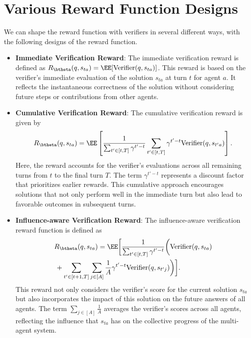 \section{Various Reward Function Designs} 
\label{appendix_reward}
{We can shape the reward function with verifiers in several different ways, with the following designs of the reward function.} 


\begin{itemize}
    \item \textbf{Immediate Verification Reward}: The immediate verification reward is defined as \( R_{\btheta} (q, s_{ta}) = \EE[\text{Verifier}(q, s_{ta})] \). This reward is based on the verifier's immediate evaluation of the solution \( s_{ta} \) at turn \( t \) for agent \( a \). It reflects the instantaneous correctness of the solution without considering future steps or contributions from other agents.

    \item \textbf{Cumulative Verification Reward}: The cumulative verification reward is given by 
    \[
    R_{\btheta} (q, s_{ta}) = \EE\left[ \frac{1}{\sum_{t' \in [t, T]} \gamma^{t'-t}} \sum_{t' \in [t, T]} \gamma^{t'-t}\text{Verifier}(q, s_{t'a})\right].
    \]
    Here, the reward accounts for the verifier's evaluations across all remaining turns from \( t \) to the final turn \( T \). The term \( \gamma^{t'-t} \) represents a discount factor that prioritizes earlier rewards. This cumulative approach encourages solutions that not only perform well in the immediate turn but also lead to favorable outcomes in subsequent turns.

    \item \textbf{Influence-aware Verification Reward}: The influence-aware verification reward function is defined as 
\begin{align*}
    &R_{\btheta}(q, s_{ta}) = \EE \bigg[\frac{1}{\sum_{t' \in [t, T]} \gamma^{t'-t}} \biggl( \text{Verifier}(q, s_{ta}) 
    \\
    &\, + \sum_{t' \in [t+1, T]}\sum_{j \in [A]} \frac{1}{A}\gamma^{t'-t}\text{Verifier}(q, s_{t'j})\biggr) \bigg].  
\end{align*}
    This reward not only considers the verifier's score for the current solution \( s_{ta} \) but also incorporates the impact of this solution on the future answers of all agents. The term \( \sum_{j \in [A]} \frac{1}{A} \) averages the verifier's scores across all agents, reflecting the influence that \( s_{ta} \) has on the collective progress of the multi-agent system.
\end{itemize}